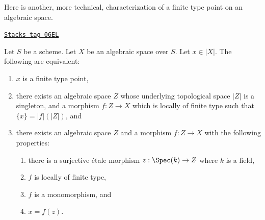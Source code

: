 Here is another, more technical, characterization of a finite type
point on an algebraic space.

\begin{lemma}
\label{spaces-morphisms-lemma-point-finite-type-monomorphism}
\href{https://stacks.math.columbia.edu/tag/06EL}{\texttt{Stacks tag 06EL}}

Let $S$ be a scheme. Let $X$ be an algebraic space over $S$.
Let $x \in |X|$. The following are equivalent:
\begin{enumerate}
\item $x$ is a finite type point,
\item there exists an algebraic space $Z$ whose underlying topological space
$|Z|$ is a singleton, and a morphism $f : Z \to X$ which is locally of finite
type such that $\{x\} = |f|(|Z|)$, and
\item there exists an algebraic space $Z$ and a morphism $f : Z \to X$
with the following properties:
\begin{enumerate}
\item there is a surjective \'etale morphism
$z : \Spec(k) \to Z$ where $k$ is a field,
\item $f$ is locally of finite type,
\item $f$ is a monomorphism, and
\item $x = f(z)$.
\end{enumerate}
\end{enumerate}
\end{lemma}

